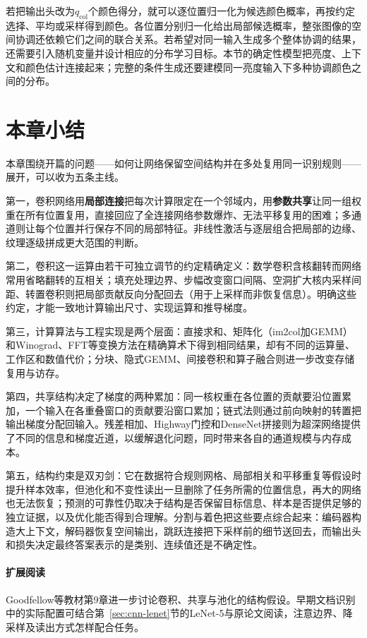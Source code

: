 若把输出头改为$q_{\mathrm{col}}$个颜色得分，就可以逐位置归一化为候选颜色概率，再按约定选择、平均或采样得到颜色。各位置分别归一化给出局部候选概率，整张图像的空间协调还依赖它们之间的联合关系。若希望对同一输入生成多个整体协调的结果，还需要引入随机变量并设计相应的分布学习目标。本节的确定性模型把亮度、上下文和颜色估计连接起来；完整的条件生成还要建模同一亮度输入下多种协调颜色之间的分布。

\section{本章小结}
\label{sec:cnn-summary}

本章围绕开篇的问题——如何让网络保留空间结构并在多处复用同一识别规则——展开，可以收为五条主线。

第一，卷积网络用\textbf{局部连接}把每次计算限定在一个邻域内，用\textbf{参数共享}让同一组权重在所有位置复用，直接回应了全连接网络参数爆炸、无法平移复用的困难；多通道则让每个位置并行保存不同的局部特征。非线性激活与逐层组合把局部的边缘、纹理逐级拼成更大范围的判断。

第二，卷积这一运算由若干可独立调节的约定精确定义：数学卷积含核翻转而网络常用省略翻转的互相关；填充处理边界、步幅改变窗口间隔、空洞扩大核内采样间距、转置卷积则把局部贡献反向分配回去（用于上采样而非恢复信息）。明确这些约定，才能一致地计算输出尺寸、实现运算和推导梯度。

第三，计算算法与工程实现是两个层面：直接求和、矩阵化（im2col加GEMM）和Winograd、FFT等变换方法在精确算术下得到相同结果，却有不同的运算量、工作区和数值代价；分块、隐式GEMM、间接卷积和算子融合则进一步改变存储复用与访存。

第四，共享结构决定了梯度的两种累加：同一核权重在各位置的贡献要沿位置累加，一个输入在各重叠窗口的贡献要沿窗口累加；链式法则通过前向映射的转置把输出梯度分配回输入。残差相加、Highway门控和DenseNet拼接则为超深网络提供了不同的信息和梯度近道，以缓解退化问题，同时带来各自的通道规模与内存成本。

第五，结构约束是双刃剑：它在数据符合规则网格、局部相关和平移重复等假设时提升样本效率，但池化和不变性读出一旦删除了任务所需的位置信息，再大的网络也无法恢复；预测的可靠性仍取决于结构是否保留目标信息、样本是否提供足够的独立证据，以及优化能否得到合理解。分割与着色把这些要点综合起来：编码器构造大上下文，解码器恢复空间输出，跳跃连接把下采样前的细节送回去，而输出头和损失决定最终答案表示的是类别、连续值还是不确定性。

\paragraph{扩展阅读}
Goodfellow等教材第9章进一步讨论卷积、共享与池化的结构假设。早期文档识别中的实际配置可结合第~\ref{sec:cnn-lenet}节的LeNet-5与原论文阅读，注意边界、降采样及读出方式怎样配合任务。
